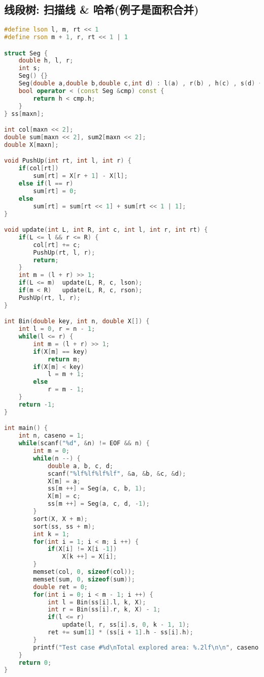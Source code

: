 \subsection{线段树: 扫描线 \& 哈希(例子是面积合并)}
    \begin{lstlisting}[language=c++]
#define lson l, m, rt << 1
#define rson m + 1, r, rt << 1 | 1

struct Seg {
    double h, l, r;
    int s; 
    Seg() {}
    Seg(double a,double b,double c,int d) : l(a) , r(b) , h(c) , s(d) {}
	bool operator < (const Seg &cmp) const {
		return h < cmp.h;
	}
} ss[maxn];

int col[maxn << 2];
double sum[maxn << 2], sum2[maxn << 2];
double X[maxn];

void PushUp(int rt, int l, int r) {
    if(col[rt])
        sum[rt] = X[r + 1] - X[l];
    else if(l == r)
        sum[rt] = 0;
    else
        sum[rt] = sum[rt << 1] + sum[rt << 1 | 1];
}

void update(int L, int R, int c, int l, int r, int rt) {
    if(L <= l && r <= R) {
        col[rt] += c;
        PushUp(rt, l, r);
        return;
    }
    int m = (l + r) >> 1;
    if(L <= m)  update(L, R, c, lson);
    if(m < R)   update(L, R, c, rson);
    PushUp(rt, l, r);
}

int Bin(double key, int n, double X[]) {
    int l = 0, r = n - 1;
    while(l <= r) {
        int m = (l + r) >> 1;
        if(X[m] == key) 
            return m;
        if(X[m] < key)  
            l = m + 1;
        else
            r = m - 1;
    }
    return -1;
}

int main() {
    int n, caseno = 1;
    while(scanf("%d", &n) != EOF && n) {
        int m = 0;
        while(n --) {
            double a, b, c, d;
            scanf("%lf%lf%lf%lf", &a, &b, &c, &d);
            X[m] = a;
            ss[m ++] = Seg(a, c, b, 1);
            X[m] = c;
            ss[m ++] = Seg(a, c, d, -1);
        }
        sort(X, X + m);
        sort(ss, ss + m);
        int k = 1;
        for(int i = 1; i < m; i ++) {
            if(X[i] != X[i -1])
                X[k ++] = X[i];
        }
        memset(col, 0, sizeof(col));
        memset(sum, 0, sizeof(sum));
        double ret = 0;
        for(int i = 0; i < m - 1; i ++) {
            int l = Bin(ss[i].l, k, X);
            int r = Bin(ss[i].r, k, X) - 1;
            if(l <= r)
                update(l, r, ss[i].s, 0, k - 1, 1);
            ret += sum[1] * (ss[i + 1].h - ss[i].h);
        }
        printf("Test case #%d\nTotal explored area: %.2lf\n\n", caseno ++, ret);
    }
    return 0;
}
    \end{lstlisting}
